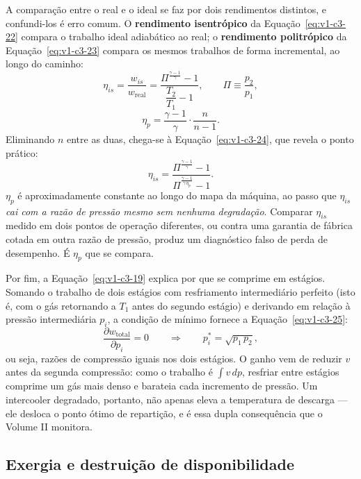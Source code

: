 \documentclass[12pt,a4paper]{article}
\numberwithin{equation}{section}
\numberwithin{table}{section}
\numberwithin{figure}{section}
\begin{document}
A comparação entre o real e o ideal se faz por dois rendimentos distintos, e
confundi-los é erro comum. O \textbf{rendimento isentrópico} da
Equação~\eqref{eq:v1-c3-22} compara o trabalho ideal adiabático ao real; o
\textbf{rendimento politrópico} da Equação~\eqref{eq:v1-c3-23} compara os
mesmos trabalhos de forma incremental, ao longo do caminho:
\begin{equation}\label{eq:v1-c3-22}
\eta_{is} = \frac{w_{is}}{w_{\text{real}}}
= \frac{\Pi^{\frac{\gamma-1}{\gamma}} - 1}{\dfrac{T_2}{T_1} - 1},
\qquad \Pi \equiv \frac{p_2}{p_1},
\end{equation}
\begin{equation}\label{eq:v1-c3-23}
\eta_p = \frac{\gamma-1}{\gamma}\cdot\frac{n}{n-1} .
\end{equation}
Eliminando $n$ entre as duas, chega-se à
Equação~\eqref{eq:v1-c3-24}, que revela o ponto prático:
\begin{equation}\label{eq:v1-c3-24}
\eta_{is} = \frac{\Pi^{\frac{\gamma-1}{\gamma}} - 1}
{\Pi^{\frac{\gamma-1}{\gamma\,\eta_p}} - 1} .
\end{equation}
$\eta_p$ é aproximadamente constante ao longo do mapa da máquina, ao passo que
$\eta_{is}$ \emph{cai com a razão de pressão mesmo sem nenhuma degradação}.
Comparar $\eta_{is}$ medido em dois pontos de operação diferentes, ou contra
uma garantia de fábrica cotada em outra razão de pressão, produz um diagnóstico
falso de perda de desempenho. É $\eta_p$ que se compara.

Por fim, a Equação~\eqref{eq:v1-c3-19} explica por que se comprime em estágios.
Somando o trabalho de dois estágios com resfriamento intermediário perfeito
(isto é, com o gás retornando a $T_1$ antes do segundo estágio) e derivando em
relação à pressão intermediária $p_i$, a condição de mínimo fornece a
Equação~\eqref{eq:v1-c3-25}:
\begin{equation}\label{eq:v1-c3-25}
\frac{\partial w_{\text{total}}}{\partial p_i} = 0
\qquad\Longrightarrow\qquad
p_i^{*} = \sqrt{p_1\,p_2},
\end{equation}
ou seja, razões de compressão iguais nos dois estágios. O ganho vem de reduzir
$v$ antes da segunda compressão: como o trabalho é $\int v\,dp$, resfriar entre
estágios comprime um gás mais denso e barateia cada incremento de pressão. Um
intercooler degradado, portanto, não apenas eleva a temperatura de descarga ---
ele desloca o ponto ótimo de repartição, e é essa dupla consequência que o
Volume II monitora.

\subsection{Exergia e destruição de disponibilidade}\label{sub:v1-c3-exergia}
\end{document}
